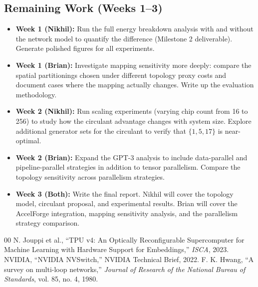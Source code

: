 \documentclass[conference,onecolumn]{IEEEtran}
\begin{document}
\subsection{Remaining Work (Weeks 1--3)}
\begin{itemize}
    \item \textbf{Week 1 (Nikhil):} Run the full energy breakdown analysis with and without the network model to quantify the difference (Milestone 2 deliverable). Generate polished figures for all experiments.
    \item \textbf{Week 1 (Brian):} Investigate mapping sensitivity more deeply: compare the spatial partitionings chosen under different topology proxy costs and document cases where the mapping actually changes. Write up the evaluation methodology.
    \item \textbf{Week 2 (Nikhil):} Run scaling experiments (varying chip count from 16 to 256) to study how the circulant advantage changes with system size. Explore additional generator sets for the circulant to verify that $\{1, 5, 17\}$ is near-optimal.
    \item \textbf{Week 2 (Brian):} Expand the GPT-3 analysis to include data-parallel and pipeline-parallel strategies in addition to tensor parallelism. Compare the topology sensitivity across parallelism strategies.
    \item \textbf{Week 3 (Both):} Write the final report. Nikhil will cover the topology model, circulant proposal, and experimental results. Brian will cover the AccelForge integration, mapping sensitivity analysis, and the parallelism strategy comparison.
\end{itemize}

\begin{thebibliography}{00}
 N. Jouppi et al., ``TPU v4: An Optically Reconfigurable Supercomputer for Machine Learning with Hardware Support for Embeddings,'' \textit{ISCA}, 2023.
 NVIDIA, ``NVIDIA NVSwitch,'' NVIDIA Technical Brief, 2022.
 F. K. Hwang, ``A survey on multi-loop networks,'' \textit{Journal of Research of the National Bureau of Standards}, vol. 85, no. 4, 1980.
\end{thebibliography}
\end{document}
